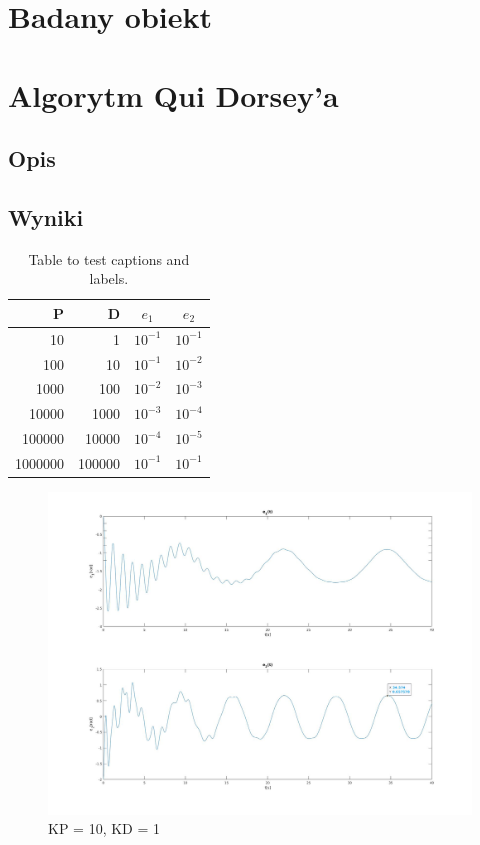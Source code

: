 \documentclass[12pt,a4paper]{article}
\begin{document}
\pdfpageheight   297mm
\pdfpagewidth    210mm

\StronaTytulowa
\SpisTresci

\pagebreak

\section{Badany obiekt}

\section{Algorytm Qui Dorsey'a}
  \subsection{Opis} %
  \subsection{Wyniki} %

  \begin{table}[h!]
    \centering
    \begin{tabular}{ r | r | c | c }
      P & D & $e_1$ & $e_2$  \\ 
      \hline
      10 & 1 & $10^{-1}$ & $10^{-1}$ \\  
      100 & 10 & $10^{-1}$ & $10^{-2}$ \\  
      1000 & 100 & $10^{-2}$ & $10^{-3}$ \\  
      10000 & 1000 & $10^{-3}$ & $10^{-4}$ \\  
      100000 & 10000 & $10^{-4}$ & $10^{-5}$ \\  
      1000000 & 100000 & $10^{-1}$ & $10^{-1}$
    \end{tabular}
    \caption{Table to test captions and labels.}
    \label{table:1}
  \end{table}

  \begin{figure}[ht]
    \centering
    \includegraphics[width=1\textwidth]{figures/qui10.jpg}
    \caption{KP = 10, KD = 1}
  \end{figure}
\end{document}
